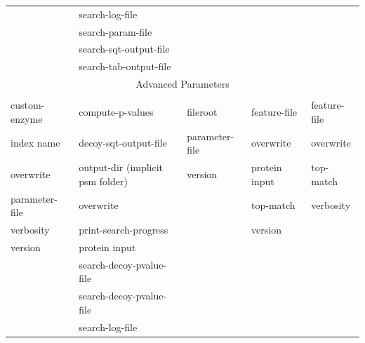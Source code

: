 \documentclass{article}
\begin{document}
\begin{table}
\begin{tabular}{lllll}
                     &search-log-file                   &                                 &                                 &                                 \\
                     &search-param-file                 &                                 &                                 &                                 \\
                     &search-sqt-output-file            &                                 &                                 &                                 \\
                     &search-tab-output-file            &                                 &                                 &                                 \\
\hline
\multicolumn{5}{c}{Advanced Parameters} \\
\hline \\
custom-enzyme        &compute-p-values                  &fileroot                         &feature-file                     &feature-file                     \\
index name           &decoy-sqt-output-file             &parameter-file                   &overwrite                        &overwrite                        \\
overwrite            &output-dir (implicit psm folder)  &version                          &protein input                    &top-match                        \\
parameter-file       &overwrite                         &                                 &top-match                        &verbosity                        \\
verbosity            &print-search-progress             &                                 &version                          &                                 \\
version              &protein input                     &                                 &                                 &                                 \\
                     &search-decoy-pvalue-file          &                                 &                                 &                                 \\
                     &search-decoy-pvalue-file          &                                 &                                 &                                 \\
                     &search-log-file                   &                                 &                                 &                                 \\

\end{tabular}
\end{table}
\end{document}

